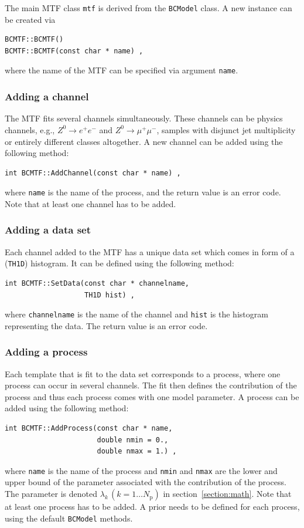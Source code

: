\documentclass[11pt, a4paper]{article}
\begin{document}
The main MTF class \verb|mtf| is derived from the \verb|BCModel| class.
A new instance can be created via
%
\begin{verbatim}
BCMTF::BCMTF()
BCMTF::BCMTF(const char * name) ,
\end{verbatim}
%
where the name of the MTF can be specified via argument \verb|name|.

\subsubsection{Adding a channel}

The MTF fits several channels simultaneously. These channels can be
physics channels, e.g., $Z^{0}\rightarrow e^{+}e^{-}$ and %
$Z^{0}\rightarrow \mu^{+}\mu^{-}$, samples with disjunct jet
multiplicity or entirely different classes altogether. A new channel
can be added using the following method:
%
\begin{verbatim}
int BCMTF::AddChannel(const char * name) ,
\end{verbatim}
%
where \verb|name| is the name of the process, and the return value is
an error code. Note that at least one channel has to be added.

\subsubsection{Adding a data set}

Each channel added to the MTF has a unique data set which comes in
form of a (\verb|TH1D|) histogram. It can be defined using the
following method:
%
\begin{verbatim}
int BCMTF::SetData(const char * channelname,
                   TH1D hist) ,
\end{verbatim}
%
where \verb|channelname| is the name of the channel and \verb|hist| is
the histogram representing the data. The return value is an error
code.

\subsubsection{Adding a process}

Each template that is fit to the data set corresponds to a process,
where one process can occur in several channels. The fit then defines
the contribution of the process and thus each process comes with one
model parameter. A process can be added using the following method:
%
\begin{verbatim}
int BCMTF::AddProcess(const char * name,
                      double nmin = 0.,
                      double nmax = 1.) ,
\end{verbatim}
%
where \verb|name| is the name of the process and \verb|nmin| and
\verb|nmax| are the lower and upper bound of the parameter associated
with the contribution of the process. The parameter is denoted
$\lambda_{k} \, (k=1\dots N_{\mathrm{p}})$ in
section~\ref{section:math}. Note that at least one process has to be
added. A prior needs to be defined for each process, using the default
\verb|BCModel| methods.
\end{document}
